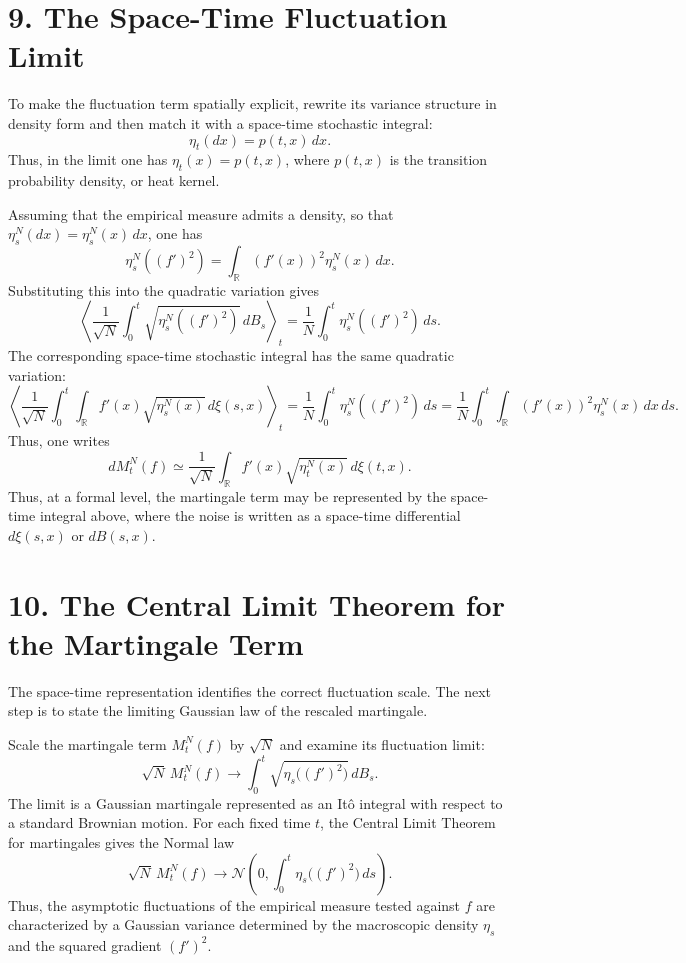 \documentclass[11pt]{article}
\theoremstyle{definition}
\theoremstyle{remark}
\begin{document}
\section*{9. The Space-Time Fluctuation Limit}
To make the fluctuation term spatially explicit, rewrite its variance structure in density form and then match it with a space-time stochastic integral:
\[
\eta_t(dx)=p(t,x)\,dx.
\]
Thus, in the limit one has $\eta_t(x)=p(t,x)$, where $p(t,x)$ is the transition probability density, or heat kernel.

Assuming that the empirical measure admits a density, so that $\eta_s^N(dx)=\eta_s^N(x)\,dx$, one has
\[
\eta_s^N((f')^2)=\int_{\mathbb R} (f'(x))^2 \eta_s^N(x)\,dx.
\]
Substituting this into the quadratic variation gives
\[
\left\langle
\frac{1}{\sqrt{N}}\int_0^t \sqrt{\eta_s^N((f')^2)}\,dB_s
\right\rangle_t
=
\frac{1}{N}\int_0^t \eta_s^N((f')^2)\,ds.
\]
The corresponding space-time stochastic integral has the same quadratic variation:
\[
\left\langle
\frac{1}{\sqrt{N}}\int_0^t \int_{\mathbb R} f'(x)\sqrt{\eta_s^N(x)}\,d\xi(s,x)
\right\rangle_t
=
\frac{1}{N}\int_0^t \eta_s^N((f')^2)\,ds
=
\frac{1}{N}\int_0^t \int_{\mathbb R} (f'(x))^2 \eta_s^N(x)\,dx\,ds.
\]
Thus, one writes
\[
dM_t^N(f)\simeq \frac{1}{\sqrt{N}}\int_{\mathbb R} f'(x)\sqrt{\eta_t^N(x)}\,d\xi(t,x).
\]
Thus, at a formal level, the martingale term may be represented by the space-time integral above, where the noise is written as a space-time differential $d\xi(s,x)$ or $dB(s,x)$.

\section*{10. The Central Limit Theorem for the Martingale Term}
The space-time representation identifies the correct fluctuation scale. The next step is to state the limiting Gaussian law of the rescaled martingale.

Scale the martingale term $M_t^N(f)$ by $\sqrt{N}$ and examine its fluctuation limit:
\[
\sqrt{N}\,M_t^N(f)\to \int_0^t \sqrt{\eta_s\bigl((f')^2\bigr)}\,dB_s.
\]
The limit is a Gaussian martingale represented as an It\^o integral with respect to a standard Brownian motion. For each fixed time $t$, the Central Limit Theorem for martingales gives the Normal law
\[
\sqrt{N}\,M_t^N(f)\to \mathcal N\!\left(0,\int_0^t \eta_s\bigl((f')^2\bigr)\,ds\right).
\]
Thus, the asymptotic fluctuations of the empirical measure tested against $f$ are characterized by a Gaussian variance determined by the macroscopic density $\eta_s$ and the squared gradient $(f')^2$.
\end{document}
